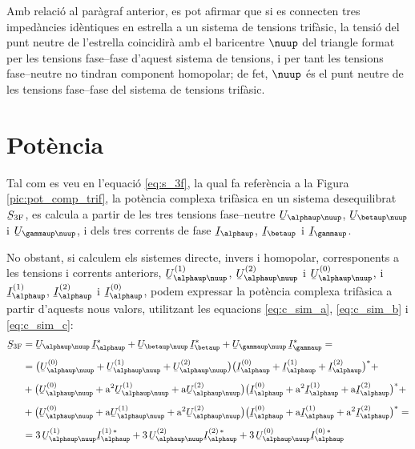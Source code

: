 Amb relaci\'{o} al par\`{a}graf anterior, es pot afirmar que si es
connecten tres imped\`{a}ncies id\`{e}ntiques en estrella a un sistema
de tensions trif\`{a}sic, la tensi\'{o} del punt neutre de l'estrella
coincidir\`{a} amb el baricentre $\nuup$ del triangle format per les tensions
fase--fase d'aquest sistema de tensions, i per tant les tensions fase--neutre no tindran
component homopolar; de fet, $\nuup$ \'{e}s el punt neutre de les tensions
fase--fase del sistema de tensions trif\`{a}sic.

\section{Pot\`{e}ncia} 

Tal com es veu en l'equaci\'{o} \eqref{eq:s_3f}, la qual fa refer\`{e}ncia a
la Figura \vref{pic:pot_comp_trif}, la pot\`{e}ncia complexa trif\`{a}sica
en un sistema desequilibrat $\cmplx{S}\ped{3F}$, es calcula a partir
de les tres tensions fase--neutre $\cmplx{U}_{\alphaup\nuup}$,
$\cmplx{U}_{\betaup\nuup}$ i $\cmplx{U}_{\gammaup\nuup}$, i dels tres
corrents de fase $\cmplx{I}_\alphaup$, $\cmplx{I}_\betaup$ i
$\cmplx{I}_\gammaup$.


No obstant, si calculem els sistemes directe, invers i homopolar,
corresponents a les tensions i corrents anteriors,
$\cmplx{U}_{\alphaup\nuup}\ap{(1)}$, $\cmplx{U}_{\alphaup\nuup}\ap{(2)}$ i
$\cmplx{U}_{\alphaup\nuup}\ap{(0)}$, i $\cmplx{I}_\alphaup\ap{(1)}$,
$\cmplx{I}_\alphaup\ap{(2)}$ i $\cmplx{I}_\alphaup\ap{(0)}$, podem
expressar la pot\`{e}ncia complexa trif\`{a}sica a partir d'aquests nous
valors, utilitzant les equacions \eqref{eq:c_sim_a},
\eqref{eq:c_sim_b} i \eqref{eq:c_sim_c}:
\begin{equation}
\begin{split}
   \cmplx{S}\ped{3F} &= \cmplx{U}_{\alphaup\nuup} \,\cmplx{I}_\alphaup^* +
   \cmplx{U}_{\betaup\nuup} \,\cmplx{I}_\betaup^* +  \cmplx{U}_{\gammaup\nuup} \,\cmplx{I}_\gammaup^* = \\[1ex]
   &= \big(\cmplx{U}_{\alphaup\nuup}^{(0)} + \cmplx{U}_{\alphaup\nuup}^{(1)} +
   \cmplx{U}_{\alphaup\nuup}^{(2)}\big) \big(\cmplx{I}_\alphaup^{(0)} + \cmplx{I}_\alphaup^{(1)} +
   \cmplx{I}_\alphaup^{(2)}\big)^* +  \\[1ex]
   &+ \big(\cmplx{U}_{\alphaup\nuup}^{(0)} + \au^2 \cmplx{U}_{\alphaup\nuup}^{(1)} +
   \au \cmplx{U}_{\alphaup\nuup}^{(2)} \big) \big(\cmplx{I}_\alphaup^{(0)} + \au^2 \cmplx{I}_\alphaup^{(1)}
    + \au \cmplx{I}_\alphaup^{(2)} \big)^* + \\[1ex]
   &+ \big(\cmplx{U}_{\alphaup\nuup}^{(0)} + \au \cmplx{U}_{\alphaup\nuup}^{(1)} + \au^2
   \cmplx{U}_{\alphaup\nuup}^{(2)} \big) \big(\cmplx{I}_\alphaup^{(0)} + \au
   \cmplx{I}_\alphaup^{(1)} + \au^2 \cmplx{I}_\alphaup^{(2)} \big)^* =  \\[1ex]
   &= 3\, \cmplx{U}_{\alphaup\nuup}^{(1)}  \cmplx{I}_\alphaup^{(1)\,*} +
   3\, \cmplx{U}_{\alphaup\nuup}^{(2)}  \cmplx{I}_\alphaup^{(2)\,*} +
   3\, \cmplx{U}_{\alphaup\nuup}^{(0)}  \cmplx{I}_\alphaup^{(0)\,*} \label{eq:c_sim_s}
\end{split}
\end{equation}

